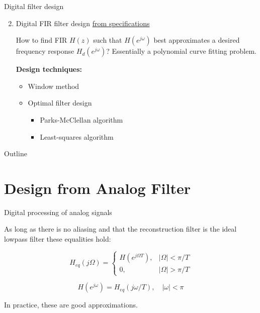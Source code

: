 \documentclass[10pt, handout]{beamer}
\begin{document}
%
\begin{frame}{Digital filter design}
\begin{enumerate}\setcounter{enumi}{1}
	\item Digital FIR filter design \underline{from specifications}
	
	How to find FIR $H(z)$ such that $H(e^{j\omega})$ best approximates a desired frequency response $H_d(e^{j\omega})$? Essentially a polynomial curve fitting problem.
	\begin{center}
		\resizebox{0.6\linewidth}{!}{}
	\end{center}
	
	\textbf{Design techniques:}
	\begin{itemize}
		\item Window method
		\item Optimal filter design
		\begin{itemize}
			\item Parks-McClellan algorithm
			\item Least-squares algorithm
		\end{itemize}
	\end{itemize}
\end{enumerate}
\end{frame}

%
\begin{frame}{Outline}
	\tableofcontents
\end{frame}

\section{Design from Analog Filter}
\begin{frame}{Digital processing of analog signals}
\begin{center}
	\def\Heff{1}
	\resizebox{\linewidth}{!}{}
\end{center}

As long as there is no aliasing and that the reconstruction filter is the ideal lowpass filter these equalities hold:

\begin{equation}
H_{eq}(j\Omega) = \begin{cases}
H(e^{j\Omega T}), & |\Omega| < \pi/T \\
0, & |\Omega| > \pi/T
\end{cases} \tag{from DSP to analog}
\end{equation}

\begin{equation}
H(e^{j\omega}) = H_{eq}(j\omega/T), \quad|\omega| < \pi  \tag{from analog to DSP}
\end{equation}

In practice, these are good approximations.
\end{frame}
\end{document}
